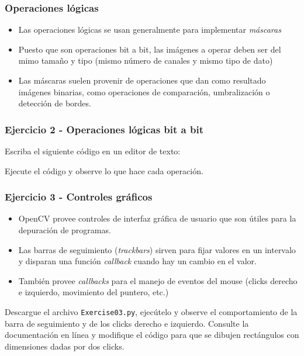 \begin{frame}\frametitle{Operaciones lógicas}
  \begin{itemize}
  \item Las operaciones lógicas se usan generalmente para implementar \textit{máscaras}
  \item Puesto que son operaciones bit a bit, las imágenes a operar deben ser del mimo tamaño y tipo (mismo número de canales y mismo tipo de dato)
  \item Las máscaras suelen provenir de operaciones que dan como resultado imágenes binarias, como operaciones de comparación, umbralización o detección de bordes. 
  \end{itemize}
\end{frame}

\begin{frame}[containsverbatim]\frametitle{Ejercicio 2 - Operaciones lógicas bit a bit}
  Escriba el siguiente código en un editor de texto:
  
  Ejecute el código y observe lo que hace cada operación.
\end{frame}

\begin{frame}[containsverbatim]\frametitle{Ejercicio 3 - Controles gráficos}
  \begin{itemize}
  \item OpenCV provee controles de interfaz gráfica de usuario que son útiles para la depuración de programas.
  \item Las barras de seguimiento (\textit{trackbars}) sirven para fijar valores en un intervalo y disparan una función \textit{callback} cuando hay un cambio en el valor.
  \item También provee \textit{callbacks} para el manejo de eventos del mouse (clicks derecho e izquierdo, movimiento del puntero, etc.)
  \end{itemize}
  Descargue el archivo \texttt{Exercise03.py}, ejecútelo y observe el comportamiento de la barra de seguimiento y de los clicks derecho e izquierdo. Consulte la documentación en línea y modifique el código para que se dibujen rectángulos con dimensiones dadas por dos clicks. 
\end{frame}

